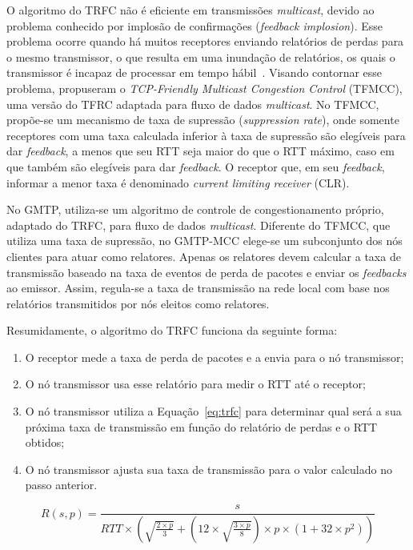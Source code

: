 O algoritmo do TRFC não é eficiente em transmissões \textit{multicast}, devido ao problema conhecido por implosão de confirmações (\textit{feedback implosion}). Esse problema ocorre quando há muitos receptores enviando relatórios de perdas para o mesmo transmissor, o que resulta em uma inundação de relatórios, os quais o transmissor é incapaz de processar em tempo hábil~\cite{sales2014gmtp}.
Visando contornar esse problema,  propuseram o \textit{TCP-Friendly Multicast Congestion Control} (TFMCC), uma versão do TFRC adaptada para fluxo de dados \textit{multicast}.
No TFMCC, propõe-se um mecanismo de taxa de supressão (\textit{suppression rate}), onde somente receptores com uma taxa calculada inferior à taxa de supressão são elegíveis para dar \textit{feedback}, a menos que seu RTT seja maior do que o RTT máximo, caso em que também são elegíveis para dar \textit{feedback}.
O receptor que, em seu \textit{feedback}, informar a menor taxa é denominado \textit{current limiting receiver} (CLR).

No GMTP, utiliza-se um algoritmo de controle de congestionamento próprio, adaptado do TRFC, para fluxo de dados \textit{multicast}. 
Diferente do TFMCC, que utiliza uma taxa de supressão, no GMTP-MCC elege-se um subconjunto dos nós clientes para atuar como relatores. Apenas os relatores devem calcular a taxa de transmissão baseado na taxa de eventos de perda de pacotes e enviar os \textit{feedbacks} ao emissor. Assim, regula-se a taxa de transmissão na rede local com base nos relatórios transmitidos por nós eleitos como relatores.

Resumidamente, o algoritmo do TRFC funciona da seguinte forma:
\begin{enumerate}
 \item O receptor mede a taxa de perda de pacotes e a envia para o nó transmissor;
 \item O nó transmissor usa esse relatório para medir o RTT até o receptor;
 \item O nó transmissor utiliza a Equação~\ref{eq:trfc} para determinar qual será a sua próxima taxa de transmissão em função do relatório de perdas e o RTT obtidos;
 \item O nó transmissor ajusta sua taxa de transmissão para o valor calculado no passo anterior.
\end{enumerate}

\begin{equation}
R(s,p) = \frac{s}{RTT \times \left(\sqrt{\frac{2 \times p}{3}} + \left(12 \times
\sqrt{\frac{3 \times p}{8}}\right) \times p \times (1 + 32 \times p^2)\right)}
\label{eq:trfc}
\end{equation}

